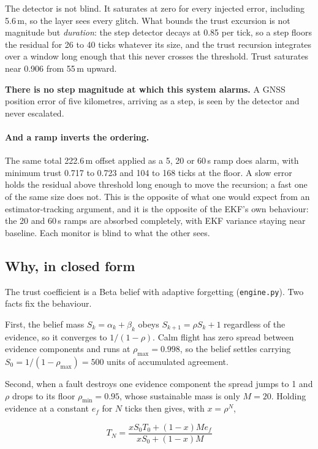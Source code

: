 \documentclass[11pt,a4paper]{article}
\newcommand{\code}[1]{\texttt{\small #1}}
\begin{document}
The detector is not blind. It saturates at zero for every injected error,
including 5.6\,m, so the layer sees every glitch. What bounds the trust
excursion is not magnitude but \emph{duration}: the step detector decays at
0.85 per tick, so a step floors the residual for 26 to 40 ticks whatever its
size, and the trust recursion integrates over a window long enough that this
never crosses the threshold. Trust saturates near 0.906 from 55\,m upward.

\textbf{There is no step magnitude at which this system alarms.} A GNSS
position error of five kilometres, arriving as a step, is seen by the detector
and never escalated.

\paragraph{And a ramp inverts the ordering.} The same total 222.6\,m offset
applied as a 5, 20 or 60\,s ramp does alarm, with minimum trust 0.717 to 0.723
and 104 to 168 ticks at the floor. A slow error holds the residual above
threshold long enough to move the recursion; a fast one of the same size does
not. This is the opposite of what one would expect from an estimator-tracking
argument, and it is the opposite of the EKF's own behaviour: the 20 and 60\,s
ramps are absorbed completely, with EKF variance staying near baseline. Each
monitor is blind to what the other sees.

\subsection{Why, in closed form}
\label{sec:algebra}

The trust coefficient is a Beta belief with adaptive forgetting
(\code{engine.py}). Two facts fix the behaviour.

First, the belief mass $S_k = \alpha_k + \beta_k$ obeys
$S_{k+1} = \rho S_k + 1$ regardless of the evidence, so it converges to
$1/(1-\rho)$. Calm flight has zero spread between evidence components and runs
at $\rho_{\max} = 0.998$, so the belief settles carrying
$S_0 = 1/(1-\rho_{\max}) = 500$ units of accumulated agreement.

Second, when a fault destroys one evidence component the spread jumps to 1 and
$\rho$ drops to its floor $\rho_{\min} = 0.95$, whose sustainable mass is only
$M = 20$. Holding evidence at a constant $e_f$ for $N$ ticks then gives, with
$x = \rho^N$,

\begin{equation}
T_N = \frac{x S_0 T_0 + (1-x) M e_f}{x S_0 + (1-x) M}
\label{eq:trustlag}
\end{equation}
\end{document}
